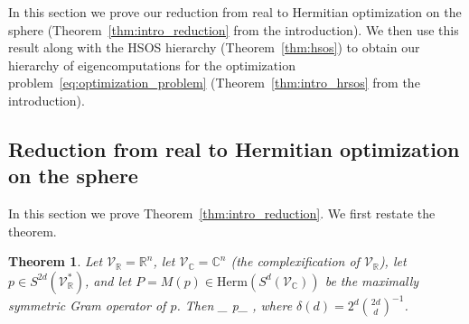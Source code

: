 \documentclass[11pt]{article}
\newtheorem{theorem}{Theorem}
\numberwithin{theorem}{section}
\theoremstyle{definition}
\newcommand{\setft}[1]{\mathrm{#1}}
\newcommand{\Herm}{\setft{Herm}}
\newcommand{\complex}{\mathbb{C}}
\newcommand{\real}{\mathbb{R}}
\newcommand\V{\mathcal{V}}
\def\ba#1\ea{\begin{align}#1\end{align}}
\newcommand{\Vc}{\V_{\complex}}
\newcommand{\Vr}{\V_{\real}}
\begin{document}
In this section we prove our reduction from real to Hermitian optimization on the sphere (Theorem~\ref{thm:intro_reduction} from the introduction). We then use this result along with the HSOS hierarchy (Theorem~\ref{thm:hsos}) to obtain our hierarchy of eigencomputations for the optimization problem~\eqref{eq:optimization_problem} (Theorem~\ref{thm:intro_hrsos} from the introduction).

\subsection{Reduction from real to Hermitian optimization on the sphere}
In this section we prove Theorem~\ref{thm:intro_reduction}. We first restate the theorem.
\begin{theorem}\label{thm:real_opt}
Let $\Vr=\real^n$, let $\Vc=\complex^n$ (the complexification of $\Vr$), let $p \in S^{2d}(\Vr^*)$, and let $P=M(p) \in \Herm(S^d(\Vc))$ be the maximally symmetric Gram operator of $p$. Then
\ba
P_{\min} \leq p_{\min} \leq {},
\ea
where $\delta(d)={2^d}{\binom{2d}{d}^{-1}}$.
\end{theorem}
\end{document}
